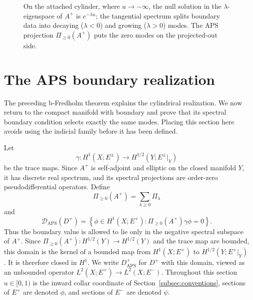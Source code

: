 \documentclass[12pt,oneside,reqno]{article}
\theoremstyle{plain}
\theoremstyle{definition}
\theoremstyle{remark}
\begin{document}
\begin{figure}[htbp]
\centering
{}
\caption[APS splitting of cylindrical modes]{On the attached cylinder,
where \(u\to-\infty\), the null solution in the \(\lambda\)-eigenspace of
\(A^+\) is \(e^{-\lambda u}\); the tangential spectrum splits boundary data
into decaying (\(\lambda<0\)) and growing (\(\lambda>0\)) modes. The APS
projection \(\Pi_{\geq0}(A^+)\) puts the zero modes on the projected-out
side.}
\end{figure}

\section{The APS boundary realization}
\label{sec:APS-realization}

The preceding b-Fredholm theorem explains the cylindrical realization.
We now return to the compact manifold with boundary and prove that its
spectral boundary condition selects exactly the same modes.  Placing this
section here avoids using the indicial family before it has been defined.

Let
\[
 \gamma:H^1(X;E^\pm)\longrightarrow H^{1/2}(Y;E^\pm|_Y)
\]
be the trace maps. Since \(A^+\) is self-adjoint and elliptic on the closed
manifold \(Y\), it has discrete real spectrum, and its spectral projections
are order-zero pseudodifferential operators. Define
\[
 \Pi_{\geq0}(A^+)=\sum_{\lambda\geq0}\Pi_\lambda
\]
and
\[
\mathcal D_{\mathrm{APS}}(D^+)
 =\left\{\phi\in H^1(X;E^+):
          \Pi_{\geq0}(A^+)\gamma\phi=0\right\}.
\]
Thus the boundary value is allowed to lie only in the negative spectral
subspace of \(A^+\). Since
\(\Pi_{\geq0}(A^+):H^{1/2}(Y)\to H^{1/2}(Y)\) and the trace map are bounded,
this domain is the kernel of a bounded map from \(H^1(X;E^+)\) to
\(H^{1/2}(Y;E^+|_Y)\). It is therefore closed in \(H^1\).
We write \(D^+_{\mathrm{APS}}\) for \(D^+\) with this domain, viewed as an
unbounded operator \(L^2(X;E^+)\to L^2(X;E^-)\). Throughout this section
\(u\in[0,1)\) is the inward collar coordinate of
Section~\ref{subsec:conventions}, sections of \(E^+\) are denoted
\(\phi\), and sections of \(E^-\) are denoted \(\psi\).
\end{document}
